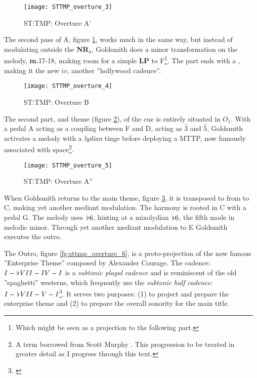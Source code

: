 \begin{figure}
\center
\texttt{[image: STTMP\_overture\_3]}
	\caption{ST:TMP: Overture A'}
	\label{fg:sttmp_overture_3}
\end{figure}
The second pass of A, figure \ref{fg:sttmp_overture_3}, works much in the same way, but instead of modulating outside the \textbf{NR\(_{4}\)}, Goldsmith does a minor transformation on the melody, \textbf{m.}17-18, making room for a simple \textbf{LP} to F\footnote{Which might be seen as a projection to the following part.}. The part ends with a \aissm, making it the new \(iv\), another ''hollywood cadence''. 

\begin{figure}
\center
\texttt{[image: STTMP\_overture\_4]}
	\caption{ST:TMP: Overture B}
	\label{fg:sttmp_overture_4}
\end{figure}
The second part, and theme (figure \ref{fg:sttmp_overture_4}), of the cue is entirely situated in \(O_{1}\). With a pedal A acting as a coupling between F and D, acting as \(\hat{3}\) and \(\hat{5}\), Goldsmith activates a melody with a \textit{lydian} tinge before deploying a \ac{MTTP}, now famously associated with space\footnote{A term borrowed from Scott Murphy \citet{murphy_major_2006}. This progression to be treated in greater detail as I progress through this text.}.


\begin{figure}
\center
\texttt{[image: STTMP\_overture\_5]}
	\caption{ST:TMP: Overture A''}
	\label{fg:sttmp_overture_5}
\end{figure}
When Goldsmith returns to the main theme, figure \ref{fg:sttmp_overture_5}, it is transposed to from \aflat to C, making yet another mediant modulation. The harmony is rooted in C with a pedal G. The melody uses \(\hspace*{0.18ex}\flat\hspace*{0.18ex}{6}\), hinting at a mixolydian \(\hspace*{0.18ex}\flat\hspace*{0.18ex}{6}\), the fifth mode in melodic minor. Through yet another mediant modulation to E Goldsmith executes the outro.


The Outro, figure \ref{fg:sttmp_overture_6}, is a proto-projection of the now famous ''Enterprise Theme'' composed by Alexander Courage. The cadence: \(I-{\hspace*{0.18ex}\flat\hspace*{0.18ex}}VII-IV-I\) is a \emph{subtonic plagal cadence} and is reminiscent of the old ''spaghetti'' westerns, which frequently use the \emph{subtonic half cadence}: \(I-{\hspace*{0.18ex}\flat\hspace*{0.18ex}}VII-V-I\)\footnote{\citealt{lehman_hollywood_2013}}. It serves two purposes: (1) to project and prepare the enterprise theme and (2) to prepare the overall sonority for the main title.

